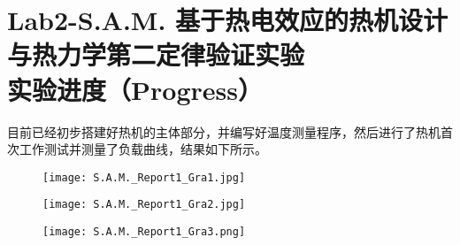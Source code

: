 \documentclass[dvipsnames, svgnames,a4paper,11pt]{article}
\begin{document}
	\quad
	
	\begin{figure}[htbp]
		\centering
	\end{figure}
	
	
	
	
	
	
	\clearpage
	
	
	
	\section{Lab2-S.A.M. 基于热电效应的热机设计与热力学第二定律验证实验\\ \quad\heiti 实验进度（Progress）}
	
	目前已经初步搭建好热机的主体部分，并编写好温度测量程序，然后进行了热机首次工作测试并测量了负载曲线，结果如下所示。
	
	\begin{figure}[htbp]
		\centering
		\texttt{[image: S.A.M.\_Report1\_Gra1.jpg]}
	\end{figure}
	
	\begin{figure}[htbp]
		\centering
		\texttt{[image: S.A.M.\_Report1\_Gra2.jpg]}
	\end{figure}
	
	\clearpage
	\begin{figure}[htbp]
		\centering
		\texttt{[image: S.A.M.\_Report1\_Gra3.png]}
	\end{figure}
	
	
	
\end{document}
